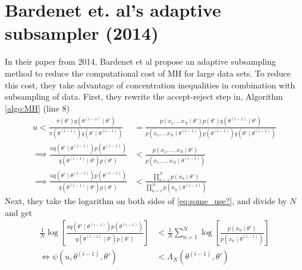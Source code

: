 \section{Bardenet et. al's adaptive subsampler (2014)}\label{sec:conf_sampler}
In their paper from 2014, Bardenet et al \cite{Bardenet:2} propose an adaptive subsampling method to reduce the computational cost of MH for large data sets.  
To reduce this cost, they take advantage of concentration inequalities in combination with subsampling of data. 
First, they rewrite the accept-reject step in, Algorithm \ref{algo:MH}  (line 8)  
\begin{equation}\label{eq:some_use?}
\begin{split}
    u < \frac{\pi\left(\theta'\right)q\left(\theta^{(i-1)}\mid \theta'\right)}{\pi \left(\theta^{(i-1)}\right)q\left(\theta'\mid \theta^{(i-1)}\right)} &= \frac{p\left(x_1, \ldots x_N \mid \theta'\right) p\left(\theta'\right)q\left(\theta^{(i-1)}\mid \theta'\right)}{p\left(x_1, \ldots x_N\mid \theta^{(i-1)}\right)p\left(\theta^{(i-1)}\right)q\left(\theta'\mid\theta^{(i-1)}\right)} \\ 
    \implies \frac{u q\left(\theta'\mid \theta^{(i-1)} \right)p\left(\theta^{(i-1)}\right)}{q\left(\theta^{(i-1)}\mid\theta'\right)p\left(\theta'\right)} &< \frac{p\left(x_1, \ldots, x_N \mid \theta'\right)}{p\left(x_1, \ldots, x_N \mid \theta^{(i-1)}\right)} \\
    \implies \frac{u q\left(\theta'\mid \theta^{(i-1)} \right) p\left(\theta^{(i-1)}\right)}{q\left(\theta^{(i-1)} \mid \theta'\right) p \left(\theta'\right)} &< \frac{\prod_{n = 1}^N p\left(x_n\mid \theta'\right)}{\prod_{n = 1}^N p\left(x_n \mid \theta^{(i-1)}\right)}
    \end{split}
\end{equation}
Next, they take the logarithm on both sides of \ref{eq:some_use?}, and divide by $N$ and get
\begin{equation}\label{eq:psi_lambda}
\begin{split}
     \frac{1}{N} \log \left[\frac{u q\left(\theta' \mid \theta^{\left(i-1\right)}\right)p\left(\theta^{\left(i-1\right)}\right)}{q\left(\theta^{\left(i-1\right)}\mid \theta'\right)p\left(\theta'\right)}\right] &< \frac{1}{N} \sum_{n = 1}^N \log \left[\frac{p\left(x_n\mid \theta'\right)}{p\left(x_n \mid \theta^{(i-1)}\right)}\right] \\
     \iff  \psi\left(u, \theta^{(i-1)}, \theta'\right) &< \Lambda_N\left(\theta^{(i-1)},\theta'\right) 
\end{split}
\end{equation}
